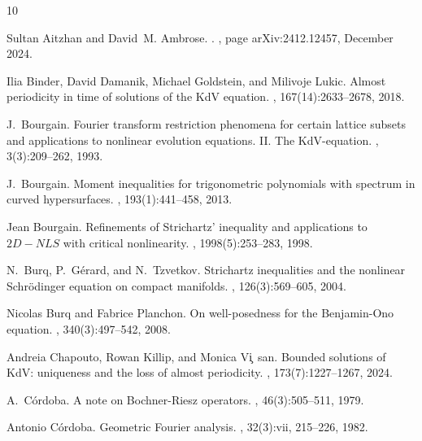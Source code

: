 \documentclass{amsart}
\theoremstyle{definition}
\begin{document}
\begin{thebibliography}{10}

Sultan {Aitzhan} and David~M. {Ambrose}.
.
, page arXiv:2412.12457, December 2024.

Ilia Binder, David Damanik, Michael Goldstein, and Milivoje Lukic.
\newblock Almost periodicity in time of solutions of the {K}d{V} equation.
, 167(14):2633--2678, 2018.

J.~Bourgain.
\newblock Fourier transform restriction phenomena for certain lattice subsets
  and applications to nonlinear evolution equations. {II}. {T}he
  {K}d{V}-equation.
, 3(3):209--262, 1993.

J.~Bourgain.
\newblock Moment inequalities for trigonometric polynomials with spectrum in
  curved hypersurfaces.
, 193(1):441--458, 2013.

Jean Bourgain.
\newblock Refinements of {Strichartz}' inequality and applications to
  {{\(2D-NLS\)}} with critical nonlinearity.
, 1998(5):253--283, 1998.

N.~Burq, P.~G\'{e}rard, and N.~Tzvetkov.
\newblock Strichartz inequalities and the nonlinear {S}chr\"{o}dinger equation
  on compact manifolds.
, 126(3):569--605, 2004.

Nicolas Burq and Fabrice Planchon.
\newblock On well-posedness for the {B}enjamin-{O}no equation.
, 340(3):497--542, 2008.

Andreia Chapouto, Rowan Killip, and Monica Vi\c~san.
\newblock Bounded solutions of {K}d{V}: uniqueness and the loss of almost
  periodicity.
, 173(7):1227--1267, 2024.

A.~C\'{o}rdoba.
\newblock A note on {B}ochner-{R}iesz operators.
, 46(3):505--511, 1979.

Antonio C\'{o}rdoba.
\newblock Geometric {F}ourier analysis.
, 32(3):vii, 215--226, 1982.


\end{thebibliography}
\end{document}
